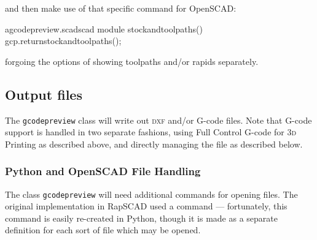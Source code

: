 \documentclass{ltxdoc}
\begin{document}
\noindent and then make use of that specific command for OpenSCAD:

\lstset{firstnumber=\thegcpscad}
\begin{writecode}{a}{gcodepreview.scad}{scad}
module stockandtoolpaths(){
    gcp.returnstockandtoolpaths();
}

\end{writecode}
\addtocounter{gcpscad}{4}

\noindent forgoing the options of showing toolpaths and/or rapids separately.


\subsection{Output files}

The \verb|gcodepreview| class will write out \textsc{dxf} and/or G-code files. Note that G-code support is handled in two separate fashions, using Full Control G-code for \textsc{3d} Printing as described above, and directly managing the file as described below.


\subsubsection{Python and OpenSCAD File Handling}

The class \verb|gcodepreview| will need additional commands for opening files. The original implementation in {RapSCAD} used a command  --- fortunately, this command is easily re-created in Python, though it is made as a separate definition for each sort of file which may be opened. 

\end{document}
